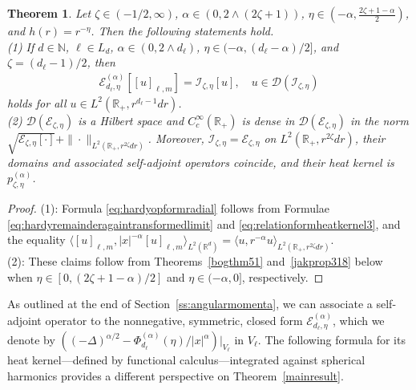 \documentclass[12pt,reqno]{amsart}
\newtheorem{theorem}{Theorem}[section]
\theoremstyle{definition}
\theoremstyle{remark}
\numberwithin{equation}{section}
\newcommand{\1}{\mathbbm{1}}
\newcommand{\D}{\mathcal{D}}
\newcommand{\N}{\mathbb{N}}
\newcommand{\R}{\mathbb{R}}
\def\ce{\mathcal{E}}
\def\ci{\mathcal{I}}
\begin{document}
\begin{theorem}
  \label{relationhardyformheatkernel}
  Let $\zeta\in(-1/2,\infty)$,
  $\alpha\in(0,2\wedge(2\zeta+1))$,
  $\eta\in(-\alpha,\frac{2\zeta+1-\alpha}{2})$, and $h(r)=r^{-\eta}$.
  Then the following statements hold.
  \\
  \textup{(1)}
  If $d\in\N$, $\ell\in L_d$, $\alpha\in(0,2\wedge d_\ell)$, $\eta\in(-\alpha,(d_\ell-\alpha)/2]$, and $\zeta=(d_\ell-1)/2$, then
  \begin{align}
    \label{eq:hardyopformradial}
    \ce_{d_\ell,\eta}^{(\alpha)}[[u]_{\ell,m}] = \ci_{\zeta,\eta}[u], \quad u \in \D(\ci_{\zeta,\eta})
  \end{align}
  holds 
  for all $u\in L^2(\R_+,r^{d_\ell-1}dr)$.
  \\
  \textup{(2)}
  $\D(\ce_{\zeta,\eta})$ is a Hilbert space and $C_c^\infty(\R_+)$ is dense in $\D(\ce_{\zeta,\eta})$ in the norm $\sqrt{\ce_{\zeta,\eta}[\cdot]}+\|\cdot\|_{L^2(\R_+,r^{2\zeta}dr)}$.
  Moreover, $\ci_{\zeta,\eta} = \ce_{\zeta,\eta}$ on $L^2(\R_+, r^{2\zeta}dr)$, their domains and associated self-adjoint operators coincide, and their heat kernel is $p_{\zeta,\eta}^{(\alpha)}$.
\end{theorem}


\begin{proof}
  (1):
  Formula \eqref{eq:hardyopformradial} follows from Formulae \eqref{eq:hardyremainderagaintransformedlimit} and \eqref{eq:relationformheatkernel3}, and the equality $\langle[u]_{\ell,m},|x|^{-\alpha}[u]_{\ell,m}\rangle_{L^2(\R^d)}=\langle u,r^{-\alpha}u\rangle_{L^2(\R_+,r^{2\zeta}dr)}$.
  \\
  (2):
  These claims follow from Theorems~\ref{bogthm51} and~\ref{jakprop318} below when $\eta\in[0,(2\zeta+1-\alpha)/2]$ and $\eta\in(-\alpha,0]$, respectively.
\end{proof}

As outlined at the end of Section~\ref{ss:angularmomenta}, we can associate a self-adjoint operator to the nonnegative, symmetric, closed form $\ce_{d_\ell,\eta}^{(\alpha)}$, which we denote by $((-\Delta)^{\alpha/2}-\Phi_{d_\ell}^{(\alpha)}(\eta)/|x|^\alpha)|_{V_\ell}$ in $V_\ell$. The following formula for its heat kernel---defined by functional calculus---integrated against spherical harmonics provides a different perspective on Theorem~\ref{mainresult}.
\end{document}
